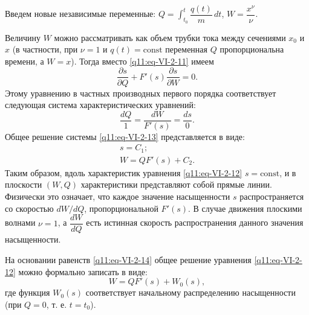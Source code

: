 Введем новые независимые переменные: $Q=\int_{t_0}^t\dfrac{q(t)}{m}\,dt$, $W=\dfrac{x^\nu}{\nu}$.

Величину $W$ можно рассматривать как объем трубки тока между сечениями $x_0$ и $x$ (в частности, при $\nu=1$ и $q(t)=\mathrm{const}$ переменная $Q$ пропорциональна времени, а $W=x$). Тогда вместо \eqref{q11:eq-VI-2-11} имеем
\begin{equation}\frac{\partial s}{\partial Q}+F'(s)\frac{\partial s}{\partial W}=0.\tag{VI.2.12}\label{q11:eq-VI-2-12}\end{equation}
Этому уравнению в частных производных первого порядка соответствует следующая система характеристических уравнений:
\begin{equation}\frac{dQ}{1}=\frac{dW}{F'(s)}=\frac{ds}{0}.\tag{VI.2.13}\label{q11:eq-VI-2-13}\end{equation}
Общее решение системы \eqref{q11:eq-VI-2-13} представляется в виде:
\begin{equation}\begin{gathered}s=C_1;\\W=QF'(s)+C_2.\end{gathered}\tag{VI.2.14}\label{q11:eq-VI-2-14}\end{equation}
Таким образом, вдоль характеристик уравнения \eqref{q11:eq-VI-2-12} $s=\mathrm{const}$, и в плоскости $(W,Q)$ характеристики представляют собой прямые линии. Физически это означает, что каждое значение насыщенности $s$ распространяется со скоростью $dW/dQ$, пропорциональной $F'(s)$. В случае движения плоскими волнами $\nu=1$, а $\dfrac{dW}{dQ}$ есть истинная скорость распространения данного значения насыщенности.

На основании равенств \eqref{q11:eq-VI-2-14} общее решение уравнения \eqref{q11:eq-VI-2-12} можно формально записать в виде:
\begin{equation}W=QF'(s)+W_0(s),\tag{VI.2.15}\label{q11:eq-VI-2-15}\end{equation}
где функция $W_0(s)$ соответствует начальному распределению насыщенности (при $Q=0$, т. е. $t=t_0$).

